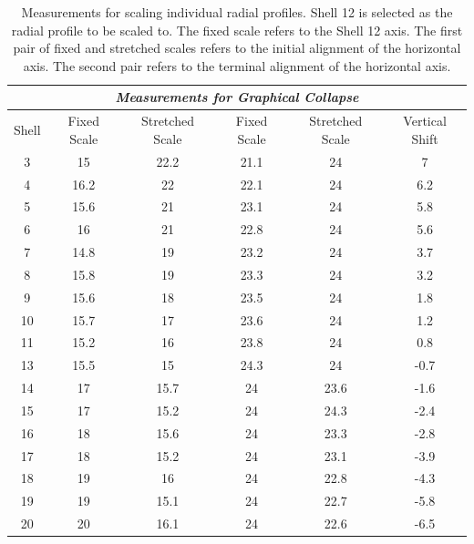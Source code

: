 \begin{table}[!htp]
    \begin{center}
    \caption{Measurements for scaling individual radial profiles.  Shell 12 is selected as the radial profile to be scaled to.  The fixed scale refers to the Shell 12 axis. The first pair of fixed and stretched scales refers to the initial alignment of the horizontal axis.  The second pair refers to the terminal alignment of the horizontal axis.}
    \begin{tabular}{||c|c|c|c|c|c||} \hline	
        \multicolumn{6}{|c|}{\emph{Measurements for Graphical Collapse}} \\ \hline \hline
        Shell & Fixed Scale & Stretched Scale & Fixed Scale & Stretched Scale & Vertical Shift \\
        \hline
        \hline
        3   &   15   &   22.2    &   21.1    &   24&     7\\
        4   &   16.2 &   22    &   22.1    &   24  &      6.2\\
        5   &   15.6 &   21    &   23.1    &   24  &      5.8\\
        6   &   16   &   21      &   22.8    &   24&      5.6\\
        7   &   14.8 &   19    &   23.2    &   24  &   3.7\\
        8   &   15.8 &   19    &   23.3    &   24  &   3.2\\
        9   &   15.6 &   18    &   23.5    &   24  &   1.8\\
        10   &   15.7&   17    &   23.6    &   24  &   1.2\\
        11   &   15.2&   16    &   23.8    &   24  &   0.8\\
        13   &   15.5&   15    &   24.3    &   24  &   -0.7\\
        14   &   17  &   15.7    &   24    &   23.6  &   -1.6\\
        15   &   17  &   15.2    &   24    &   24.3  &   -2.4\\
        16   &   18  &   15.6    &   24    &   23.3  &   -2.8\\
        17   &   18  &   15.2    &   24    &   23.1  &   -3.9\\
        18   &   19  &   16      &   24    &   22.8  &   -4.3\\
        19   &   19  &   15.1    &   24    &   22.7  &   -5.8\\
        20   &   20  &   16.1    &   24    &   22.6  &   -6.5\\
        \hline
        \hline
    \end{tabular}
    \end{center}
    \label{table: measurements}
\end{table}


